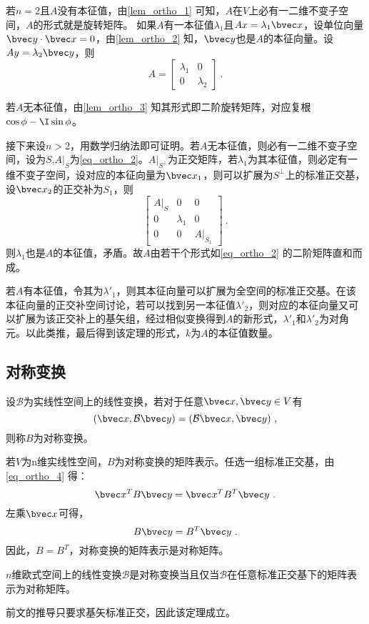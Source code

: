 若$n=2$且$A$没有本征值，由\autoref{lem_ortho_1} 可知，$A$在$V$上必有一二维不变子空间，$A$的形式就是旋转矩阵。
如果$A$有一本征值$\lambda_1$且$Ax=\lambda_1 \bvec x$，设单位向量$\bvec y\cdot \bvec x=0$，由\autoref{lem_ortho_2} 知，$\bvec y$也是$A$的本征向量。设$Ay=\lambda_2 \bvec y$，则
\begin{equation}
A=\left[\begin{array}{rr}
\lambda_1&0\\
0&\lambda_2
\end{array}
\right]~.
\end{equation}

若$A$无本征值，由\autoref{lem_ortho_3} 知其形式即二阶旋转矩阵，对应复根$\cos\phi-\I \sin\phi$。



接下来设$n>2$，用数学归纳法即可证明。若$A$无本征值，则必有一二维不变子空间，设为$S$,$A|_{S}$为\autoref{eq_ortho_2}。$A|_{S^{\bot}}$为正交矩阵，若$\lambda_1$为其本征值，则必定有一维不变子空间，设对应的本征向量为$\bvec x_1$，则可以扩展为$S^{\bot}$上的标准正交基，设$\bvec x_2$的正交补为$S_1$，则\begin{equation}
\left[\begin{array}{rrr}
A|_{S}&0&0\\
0&\lambda_1&0\\
0&0&A|_{S_1}
\end{array}
\right]~.
\end{equation}
则$\lambda_1$也是$A$的本征值，矛盾。故$A$由若干个形式如\autoref{eq_ortho_2} 的二阶矩阵直和而成。

若$A$有本征值，令其为$\lambda'_1$，则其本征向量可以扩展为全空间的标准正交基。在该本征向量的正交补空间讨论，若可以找到另一本征值$\lambda'_2$，则对应的本征向量又可以扩展为该正交补上的基矢组，经过相似变换得到$A$的新形式，$\lambda'_1$和$\lambda'_2$为对角元。以此类推，最后得到该定理的形式，$k$为$A$的本征值数量。

\subsection{对称变换}
\begin{definition}{}
设$\mathcal B$为实线性空间上的线性变换，若对于任意$\bvec x,\bvec y\in V$有
\begin{equation}\label{eq_ortho_4}
(\bvec x,\mathcal B\bvec y)=(\mathcal B\bvec x,\bvec y)~,
\end{equation}
则称$B$为对称变换。
\end{definition}

若$V$为n维实线性空间，$B$为对称变换的矩阵表示。任选一组标准正交基，由\autoref{eq_ortho_4} 得：
\begin{equation}
\bvec x^TB\bvec y=\bvec x^TB^T\bvec y~.
\end{equation}
左乘$\bvec x$可得，
\begin{equation}
B\bvec y=B^T\bvec y~.
\end{equation}
因此，$B=B^T$，对称变换的矩阵表示是对称矩阵。
\begin{theorem}{}
$n$维欧式空间上的线性变换$\mathcal B$是对称变换当且仅当$\mathcal B$在任意标准正交基下的矩阵表示为对称矩阵。
\end{theorem}
前文的推导只要求基矢标准正交，因此该定理成立。

